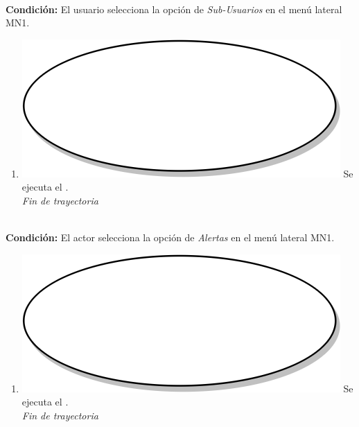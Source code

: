 \textbf{} \\
\textbf{Condición:} El usuario selecciona la opción de \textit{Sub-Usuarios} en el menú lateral MN1. \\
 \begin{enumerate}[label=I\arabic*]
    \item {\includegraphics[scale=.05]{Capitulo3/img/proceso.png} Se ejecuta el \textbf{}.} \\
    \textit{Fin de trayectoria} \\
\end{enumerate}

\textbf{} \\
\textbf{Condición:} El actor selecciona la opción de \textit{Alertas} en el menú lateral MN1. \\
 \begin{enumerate}[label=J\arabic*]
    \item {\includegraphics[scale=.05]{Capitulo3/img/proceso.png} Se ejecuta el \textbf{}.} \\
    \textit{Fin de trayectoria} \\
\end{enumerate}
